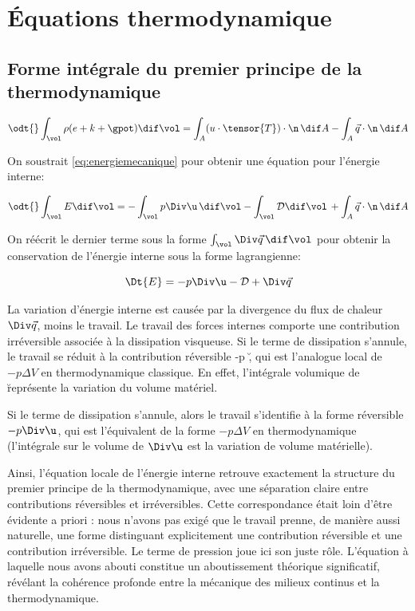 \section{Équations thermodynamique}
\subsection{Forme intégrale du premier principe de la thermodynamique}

\cite[p. 108]{kundu04aa}

\begin{equation}
\odt{}\int_\vol \rho (e + k + \gpot) \dif \vol = 
\int_A (u\cdot\tensor{T})\cdot \n \, \dif A -
\int_A \vec{q} \cdot \n \, \dif A
  \label{eq:energy}
\end{equation}

On soustrait \eqref{eq:energiemecanique} pour obtenir une équation pour l'énergie interne: 

\begin{displaymath}
\odt{}\int_\vol E \dif \vol = 
- \int_\vol p \Div \u\, \dif \vol 
-  \int_\vol \mathcal{D} \dif \vol\,
+ \int_A \vec{q} \cdot \n \, \dif A
  \label{eq:energy_euler}
\end{displaymath}

On réécrit le dernier terme sous la forme $\int_\vol \Div \vec{q} \,\dif\vol$ pour obtenir la conservation de l'énergie interne sous la forme lagrangienne: 

\begin{equation}
	\Dt{E} = - p \Div \u - \mathcal{D} + \Div\vec{q}
	\label{eq:energy_lagrange}
\end{equation}

La variation d'énergie interne est causée par la divergence du flux de chaleur $\Div\vec{q}$, moins le travail. 
Le travail des forces internes comporte une contribution irréversible associée à la dissipation visqueuse.
Si le terme de dissipation s’annule, le travail se réduit à la contribution réversible -p \Div \u, qui est l’analogue local de $-p\Delta V$ en thermodynamique classique. En effet, l’intégrale volumique de \Div \u représente la variation du volume matériel.

Si le terme de dissipation s'annule, alors le travail s'identifie à la forme réversible $-p \Div \u$, qui est l'équivalent de la forme $-p \Delta V$ en thermodynamique (l'intégrale sur le volume de $\Div\u$ est la variation de volume matérielle). 

Ainsi, l’équation locale de l’énergie interne retrouve exactement la structure du premier principe de la thermodynamique, avec une séparation claire entre contributions réversibles et irréversibles. Cette correspondance était loin d’être évidente a priori : nous n’avons pas exigé que le travail prenne, de manière aussi naturelle, une forme distinguant explicitement une contribution réversible et une contribution irréversible. Le terme de pression joue ici son juste rôle. L’équation à laquelle nous avons abouti constitue un aboutissement théorique significatif, révélant la cohérence profonde entre la mécanique des milieux continus et la thermodynamique.


